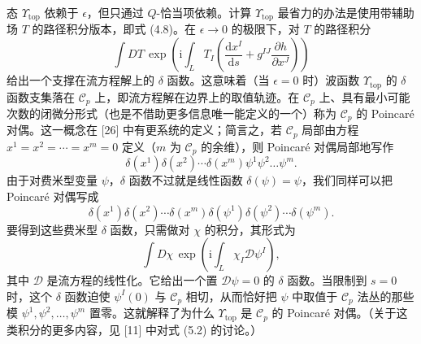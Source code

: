 \documentclass[11pt,a4paper,UTF8]{ctexart}
\theoremstyle{plain}
\theoremstyle{definition}
\begin{document}
态 $\Upsilon_{\mathrm{top}}$ 依赖于 $\epsilon$，但只通过 $Q$-恰当项依赖。计算 $\Upsilon_{\mathrm{top}}$ 最省力的办法是使用带辅助场 $T$ 的路径积分版本，即式 (4.8)。在 $\epsilon\to 0$ 的极限下，对 $T$ 的路径积分
\begin{equation}
    \int DT\,\exp\left(\mathrm{i}\int_L T_I
    \left(\frac{\mathrm{d}x^I}{\mathrm{d}s}
    +g^{IJ}\frac{\partial h}{\partial x^J}\right)\right)
    \tag{4.12}
\end{equation}
给出一个支撑在流方程解上的 $\delta$ 函数。这意味着（当 $\epsilon=0$ 时）波函数 $\Upsilon_{\mathrm{top}}$ 的 $\delta$ 函数支集落在 $\mathcal{C}_p$ 上，即流方程解在边界上的取值轨迹。在 $\mathcal{C}_p$ 上、具有最小可能次数的闭微分形式（也是不借助更多信息唯一能定义的一个）称为 $\mathcal{C}_p$ 的 Poincaré 对偶。这一概念在 [26] 中有更系统的定义；简言之，若 $\mathcal{C}_p$ 局部由方程 $x^1=x^2=\cdots=x^m=0$ 定义（$m$ 为 $\mathcal{C}_p$ 的余维），则 Poincaré 对偶局部地写作
\begin{equation}
    \delta(x^1)\delta(x^2)\cdots\delta(x^m)\psi^1\psi^2\ldots\psi^m.
    \tag{4.13}
\end{equation}
由于对费米型变量 $\psi$，$\delta$ 函数不过就是线性函数 $\delta(\psi)=\psi$，我们同样可以把 Poincaré 对偶写成
\begin{equation}
    \delta(x^1)\delta(x^2)\cdots\delta(x^m)
    \delta(\psi^1)\delta(\psi^2)\cdots\delta(\psi^m).
    \tag{4.14}
\end{equation}
要得到这些费米型 $\delta$ 函数，只需做对 $\chi$ 的积分，其形式为
\begin{equation}
    \int D\chi\,\exp\left(\mathrm{i}\int_L \chi_I\mathcal{D}\psi^I\right),
    \tag{4.15}
\end{equation}
其中 $\mathcal{D}$ 是流方程的线性化。它给出一个置 $\mathcal{D}\psi=0$ 的 $\delta$ 函数。当限制到 $s=0$ 时，这个 $\delta$ 函数迫使 $\psi^I(0)$ 与 $\mathcal{C}_p$ 相切，从而恰好把 $\psi$ 中取值于 $\mathcal{C}_p$ 法丛的那些模 $\psi^1,\psi^2,\ldots,\psi^m$ 置零。这就解释了为什么 $\Upsilon_{\mathrm{top}}$ 是 $\mathcal{C}_p$ 的 Poincaré 对偶。（关于这类积分的更多内容，见 [11] 中对式 (5.2) 的讨论。）

\end{document}
